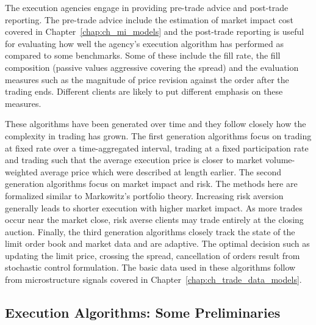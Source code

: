 The execution agencies engage in providing pre-trade advice and post-trade reporting. The pre-trade advice include the estimation of market impact cost covered in Chapter~\ref{chap:ch_mi_models} and the post-trade reporting is useful for evaluating how well the agency's execution algorithm has performed as compared to some benchmarks. Some of these include the fill rate, the fill composition (passive values aggressive covering the spread) and the evaluation measures such as the magnitude of price revision against the order after the trading ends. Different clients are likely to put different emphasis on these measures. 


These algorithms have been generated over time and they follow closely how the complexity in trading has grown. The first generation algorithms focus on trading at fixed rate over a time-aggregated interval, trading at a fixed participation rate and trading such that the average execution price is closer to market volume-weighted average price which were described at length earlier. The second generation algorithms focus on market impact and risk. The methods here are formalized similar to Markowitz's portfolio theory. Increasing risk aversion generally leads to shorter execution with higher market impact. As more trades occur near the market close, risk averse clients may trade entirely at the closing auction. Finally, the third generation algorithms closely track the state of the limit order book and market data and are adaptive. The optimal decision such as updating the limit price, crossing the spread, cancellation of orders result from stochastic control formulation. The basic data used in these algorithms follow from microstructure signals covered in Chapter~\ref{chap:ch_trade_data_models}. 



\subsection{Execution Algorithms: Some Preliminaries}


